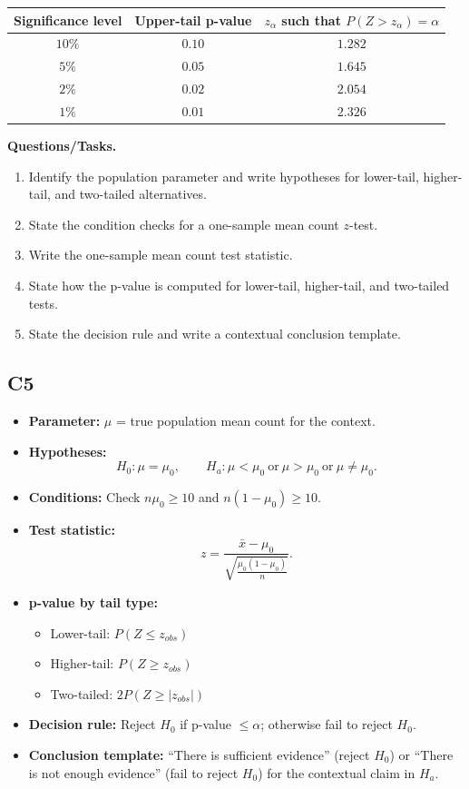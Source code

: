 \begin{center}
	\renewcommand{\arraystretch}{1.3}
	\begin{tabular}{|c|c|c|}
		\hline
		\textbf{Significance level} & \textbf{Upper-tail p-value} & \textbf{\(z_\alpha\) such that \(P(Z>z_\alpha)=\alpha\)} \\
		\hline
		\(10\%\) & \(0.10\) & \(1.282\) \\
		\hline
		\(5\%\) & \(0.05\) & \(1.645\) \\
		\hline
		\(2\%\) & \(0.02\) & \(2.054\) \\
		\hline
		\(1\%\) & \(0.01\) & \(2.326\) \\
		\hline
	\end{tabular}
\end{center}

\textbf{Questions/Tasks.}
\begin{enumerate}
	\item[(a)] Identify the population parameter and write hypotheses for lower-tail, higher-tail, and two-tailed alternatives.
	\item[(b)] State the condition checks for a one-sample mean count \(z\)-test.
	\item[(c)] Write the one-sample mean count test statistic.
	\item[(d)] State how the p-value is computed for lower-tail, higher-tail, and two-tailed tests.
	\item[(e)] State the decision rule and write a contextual conclusion template.
\end{enumerate}

\subsection*{C5}
\begin{itemize}
	\item \textbf{Parameter:} \(\mu\) = true population mean count for the context.
	\item \textbf{Hypotheses:}
	\[
	H_0\colon \mu=\mu_0,\qquad
	H_a\colon \mu<\mu_0\ \text{or}\ \mu>\mu_0\ \text{or}\ \mu\ne \mu_0.
	\]
	\item \textbf{Conditions:} Check \(n\mu_0\ge 10\) and \(n(1-\mu_0)\ge 10\).
	\item \textbf{Test statistic:}
	\[
	z=\frac{\bar x-\mu_0}{\sqrt{\frac{\mu_0(1-\mu_0)}{n}}}.
	\]
	\item \textbf{p-value by tail type:}
	\begin{itemize}
		\item Lower-tail: \(P(Z\le z_{obs})\)
		\item Higher-tail: \(P(Z\ge z_{obs})\)
		\item Two-tailed: \(2P(Z\ge |z_{obs}|)\)
	\end{itemize}
	\item \textbf{Decision rule:} Reject \(H_0\) if p-value \(\le \alpha\); otherwise fail to reject \(H_0\).
	\item \textbf{Conclusion template:} ``There is sufficient evidence'' (reject \(H_0\)) or ``There is not enough evidence'' (fail to reject \(H_0\)) for the contextual claim in \(H_a\).
\end{itemize}

